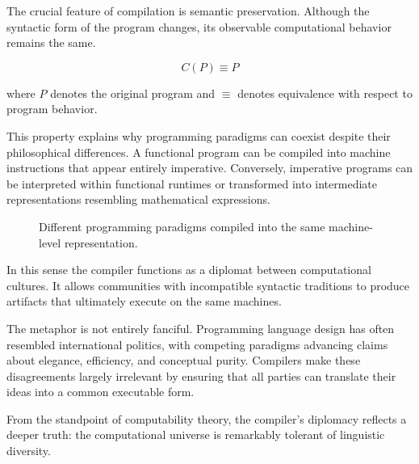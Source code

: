 \documentclass[11pt]{article}
\theoremstyle{definition}
\begin{document}
The crucial feature of compilation is semantic preservation. Although
the syntactic form of the program changes, its observable computational
behavior remains the same.

\[
C(P) \equiv P
\]

where $P$ denotes the original program and $\equiv$ denotes equivalence
with respect to program behavior.

This property explains why programming paradigms can coexist despite
their philosophical differences. A functional program can be compiled
into machine instructions that appear entirely imperative. Conversely,
imperative programs can be interpreted within functional runtimes or
transformed into intermediate representations resembling mathematical
expressions.

\begin{figure}[h]
\centering
{}
\caption{Different programming paradigms compiled into the same
machine-level representation.}
\label{fig:compiler_diplomat}
\end{figure}

In this sense the compiler functions as a diplomat between
computational cultures. It allows communities with incompatible
syntactic traditions to produce artifacts that ultimately execute on
the same machines.

The metaphor is not entirely fanciful. Programming language design has
often resembled international politics, with competing paradigms
advancing claims about elegance, efficiency, and conceptual purity.
Compilers make these disagreements largely irrelevant by ensuring that
all parties can translate their ideas into a common executable form.

From the standpoint of computability theory, the compiler's diplomacy
reflects a deeper truth: the computational universe is remarkably
tolerant of linguistic diversity.
\end{document}
